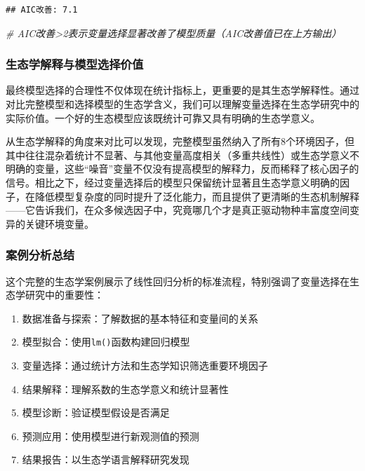 \documentclass[
  twoside,12pt,fontset=none]{ctexbook}
\newenvironment{Shaded}{\begin{snugshade}}{\end{snugshade}}
\newcommand{\CommentTok}[1]{\textcolor[rgb]{0.56,0.35,0.01}{\textit{#1}}}
\providecommand{\tightlist}{%
  \setlength{\itemsep}{0pt}\setlength{\parskip}{0pt}}
\begin{document}
\begin{verbatim}
## AIC改善: 7.1
\end{verbatim}

\begin{Shaded}
\begin{Highlighting}[]
\CommentTok{\# AIC改善\textgreater{}2表示变量选择显著改善了模型质量（AIC改善值已在上方输出）}
\end{Highlighting}
\end{Shaded}

\hypertarget{ux751fux6001ux5b66ux89e3ux91caux4e0eux6a21ux578bux9009ux62e9ux4ef7ux503c}{%
\subsubsection{生态学解释与模型选择价值}\label{ux751fux6001ux5b66ux89e3ux91caux4e0eux6a21ux578bux9009ux62e9ux4ef7ux503c}}

最终模型选择的合理性不仅体现在统计指标上，更重要的是其生态学解释性。通过对比完整模型和选择模型的生态学含义，我们可以理解变量选择在生态学研究中的实际价值。一个好的生态模型应该既统计可靠又具有明确的生态学意义。

从生态学解释的角度来对比可以发现，完整模型虽然纳入了所有8个环境因子，但其中往往混杂着统计不显著、与其他变量高度相关（多重共线性）或生态学意义不明确的变量，这些``噪音''变量不仅没有提高模型的解释力，反而稀释了核心因子的信号。相比之下，经过变量选择后的模型只保留统计显著且生态学意义明确的因子，在降低模型复杂度的同时提升了泛化能力，而且提供了更清晰的生态机制解释------它告诉我们，在众多候选因子中，究竟哪几个才是真正驱动物种丰富度空间变异的关键环境变量。

\hypertarget{ux6848ux4f8bux5206ux6790ux603bux7ed3}{%
\subsubsection{案例分析总结}\label{ux6848ux4f8bux5206ux6790ux603bux7ed3}}

这个完整的生态学案例展示了线性回归分析的标准流程，特别强调了变量选择在生态学研究中的重要性：

\begin{enumerate}
\def\labelenumi{\arabic{enumi}.}
\tightlist
\item
  数据准备与探索：了解数据的基本特征和变量间的关系
\item
  模型拟合：使用\texttt{lm()}函数构建回归模型
\item
  变量选择：通过统计方法和生态学知识筛选重要环境因子
\item
  结果解释：理解系数的生态学意义和统计显著性
\item
  模型诊断：验证模型假设是否满足
\item
  预测应用：使用模型进行新观测值的预测
\item
  结果报告：以生态学语言解释研究发现
\end{enumerate}
\end{document}
